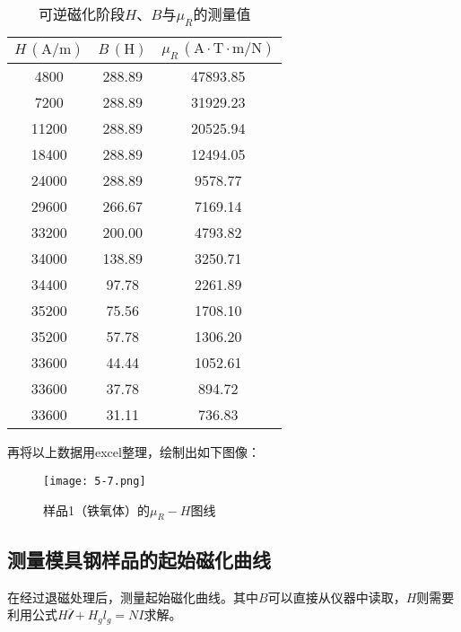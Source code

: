 \documentclass[12pt]{article}
\begin{document}
\begin{table}[htbp]
    \centering
      \begin{tabular}{|c|c|c|}
      \hline
      $H\,(\mathrm{A/m})$ & $B\,(\mathrm{H})$  & $\mu_R\,(\mathrm{A}\cdot\mathrm{T}\cdot\mathrm{m}/\mathrm{N})$ \\
      \hline
      4800  & 288.89  & 47893.85 \\
      \hline
      7200  & 288.89  & 31929.23 \\
      \hline
      11200 & 288.89  & 20525.94 \\
      \hline
      18400 & 288.89  & 12494.05 \\
      \hline
      24000 & 288.89  & 9578.77 \\
      \hline
      29600 & 266.67  & 7169.14 \\
      \hline
      33200 & 200.00  & 4793.82 \\
      \hline
      34000 & 138.89  & 3250.71 \\
      \hline
      34400 & 97.78  & 2261.89 \\
      \hline
      35200 & 75.56  & 1708.10 \\
      \hline
      35200 & 57.78  & 1306.20 \\
      \hline
      33600 & 44.44  & 1052.61 \\
      \hline
      33600 & 37.78  & 894.72 \\
      \hline
      33600 & 31.11  & 736.83 \\
      \hline
      \end{tabular}%
    \caption{可逆磁化阶段$H$、$B$与$\mu_R$的测量值}
  \end{table}%

再将以上数据用excel整理，绘制出如下图像：

\begin{figure}[htbp]
    \centering
    \texttt{[image: 5-7.png]}
    \caption{样品1（铁氧体）的$\mu_R-H$图线}
\end{figure}

\subsection{测量模具钢样品的起始磁化曲线}

在经过退磁处理后，测量起始磁化曲线。其中$B$可以直接从仪器中读取，$H$则需要利用公式$H\overline{\mathscr{l}}+H_gl_g=NI$求解。
\end{document}

